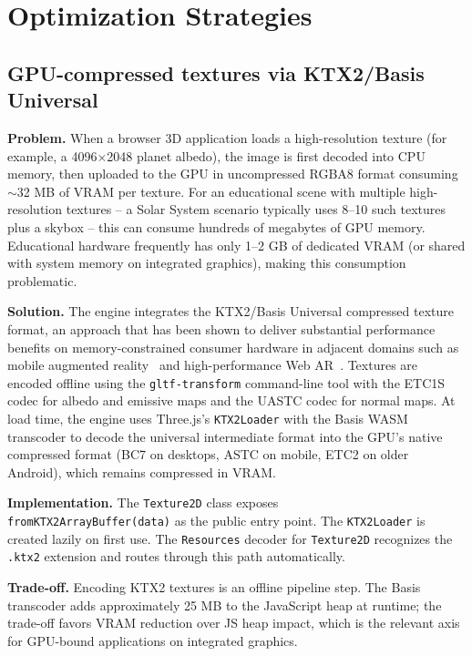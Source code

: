 \section{Optimization Strategies}

\subsection{GPU-compressed textures via KTX2/Basis Universal}
\textbf{Problem.} When a browser 3D application loads a high-resolution texture (for example, a 4096$\times$2048 planet albedo), the image is first decoded into CPU memory, then uploaded to the GPU in uncompressed RGBA8 format consuming $\sim$32 MB of VRAM per texture. For an educational scene with multiple high-resolution textures -- a Solar System scenario typically uses 8--10 such textures plus a skybox -- this can consume hundreds of megabytes of GPU memory. Educational hardware frequently has only 1--2 GB of dedicated VRAM (or shared with system memory on integrated graphics), making this consumption problematic.

\textbf{Solution.} The engine integrates the KTX2/Basis Universal compressed texture format, an approach that has been shown to deliver substantial performance benefits on memory-constrained consumer hardware in adjacent domains such as mobile augmented reality~\cite{Suwandi2026} and high-performance Web AR~\cite{Boutsi2023}. Textures are encoded offline using the \texttt{gltf-transform} command-line tool with the ETC1S codec for albedo and emissive maps and the UASTC codec for normal maps. At load time, the engine uses Three.js's \texttt{KTX2Loader} with the Basis WASM transcoder to decode the universal intermediate format into the GPU's native compressed format (BC7 on desktops, ASTC on mobile, ETC2 on older Android), which remains compressed in VRAM.

\textbf{Implementation.} The \texttt{Texture2D} class exposes \\\texttt{fromKTX2ArrayBuffer(data)} as the public entry point. The \texttt{KTX2Loader} is created lazily on first use. The \texttt{Resources} decoder for \texttt{Texture2D} recognizes the \texttt{.ktx2} extension and routes through this path automatically.

\textbf{Trade-off.} Encoding KTX2 textures is an offline pipeline step. The Basis transcoder adds approximately 25 MB to the JavaScript heap at runtime; the trade-off favors VRAM reduction over JS heap impact, which is the relevant axis for GPU-bound applications on integrated graphics.

